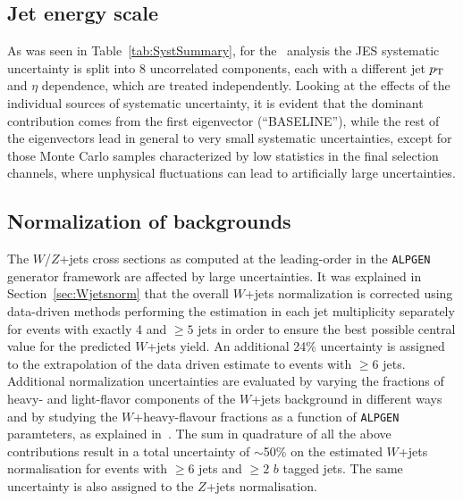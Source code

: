 \subsection{Jet energy scale}\label{sec:htx_syst_jes}
As was seen in Table~\ref{tab:SystSummary}, for the \htx\ analysis
the JES systematic uncertainty is split into 8
uncorrelated components, each with a different jet $\pt$ and $\eta$
dependence, which are treated independently.
Looking at the effects of the individual sources of systematic uncertainty, 
it is evident that the dominant contribution comes from the first 
eigenvector (``BASELINE''), while the rest of the
eigenvectors lead in general to very small systematic uncertainties, 
except for those Monte Carlo samples characterized by low statistics
in the final selection channels, where unphysical fluctuations
can lead to artificially large uncertainties. 

\subsection{Normalization of backgrounds}\label{sec:syst_normHTX}

The $W$/$Z$+jets cross sections as computed at the
leading-order in the
\texttt{ALPGEN} generator framework
are affected by large uncertainties.
It was explained in Section~\ref{sec:Wjetsnorm}
that the overall $W$+jets normalization is 
corrected using data-driven methods 
performing the estimation in each jet multiplicity
separately for events with exactly 4 and $\geq 5$ 
jets in order to ensure the best possible central value for the 
predicted $W$+jets yield. 
An additional 24\% uncertainty is assigned to the extrapolation of the data driven
estimate to events with $\geq 6$ jets.
Additional normalization uncertainties are evaluated by varying 
the fractions of heavy- and light-flavor components of the $W$+jets background
in different ways and by studying the $W$+heavy-flavour fractions as
a function of \texttt{ALPGEN} paramteters,
as explained in~\cite{topcommon2013}.
The sum in quadrature of all the above contributions result in a 
total uncertainty of $\sim$50\% on
the estimated $W$+jets normalisation for events 
with $\geq 6$ jets and $\geq 2$ $b$ tagged jets. 
The same uncertainty is also assigned to the $Z$+jets normalisation.

